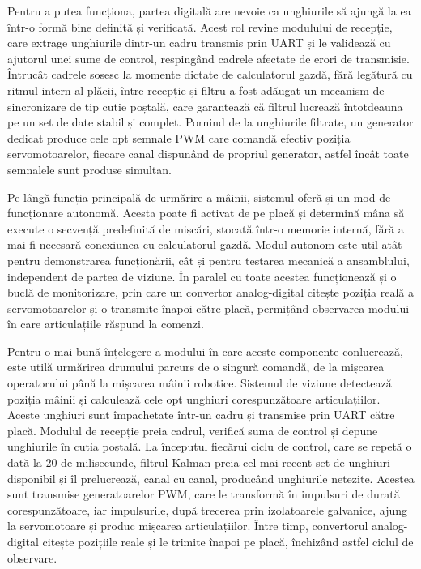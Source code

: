 Pentru a putea funcționa, partea digitală are nevoie ca unghiurile să ajungă la ea
într-o formă bine definită și verificată. Acest rol revine modulului de recepție,
care extrage unghiurile dintr-un cadru transmis prin UART și le validează cu ajutorul
unei sume de control, respingând cadrele afectate de erori de transmisie. Întrucât
cadrele sosesc la momente dictate de calculatorul gazdă, fără legătură cu ritmul
intern al plăcii, între recepție și filtru a fost adăugat un mecanism de sincronizare
de tip cutie poștală, care garantează că filtrul lucrează întotdeauna pe un set de
date stabil și complet. Pornind de la unghiurile filtrate, un generator dedicat
produce cele opt semnale PWM care comandă efectiv poziția servomotoarelor, fiecare
canal dispunând de propriul generator, astfel încât toate semnalele sunt produse
simultan.

Pe lângă funcția principală de urmărire a mâinii, sistemul oferă și un mod de
funcționare autonomă. Acesta poate fi activat de pe placă și determină mâna să execute
o secvență predefinită de mișcări, stocată într-o memorie internă, fără a mai fi
necesară conexiunea cu calculatorul gazdă. Modul autonom este util atât pentru
demonstrarea funcționării, cât și pentru testarea mecanică a ansamblului, independent
de partea de viziune. În paralel cu toate acestea funcționează și o buclă de
monitorizare, prin care un convertor analog-digital citește poziția reală a
servomotoarelor și o transmite înapoi către placă, permițând observarea modului în
care articulațiile răspund la comenzi.

Pentru o mai bună înțelegere a modului în care aceste componente conlucrează, este
utilă urmărirea drumului parcurs de o singură comandă, de la mișcarea operatorului
până la mișcarea mâinii robotice. Sistemul de viziune detectează poziția mâinii și
calculează cele opt unghiuri corespunzătoare articulațiilor. Aceste unghiuri sunt
împachetate într-un cadru și transmise prin UART către placă. Modulul de recepție
preia cadrul, verifică suma de control și depune unghiurile în cutia poștală. La
începutul fiecărui ciclu de control, care se repetă o dată la 20 de milisecunde,
filtrul Kalman preia cel mai recent set de unghiuri disponibil și îl prelucrează,
canal cu canal, producând unghiurile netezite. Acestea sunt transmise generatoarelor
PWM, care le transformă în impulsuri de durată corespunzătoare, iar impulsurile,
după trecerea prin izolatoarele galvanice, ajung la servomotoare și produc mișcarea
articulațiilor. Între timp, convertorul analog-digital citește pozițiile reale și le
trimite înapoi pe placă, închizând astfel ciclul de observare.

